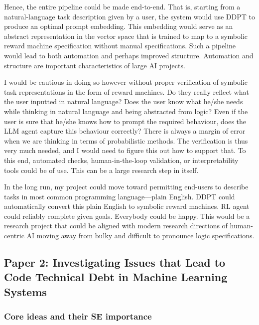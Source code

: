 \documentclass[a4paper,10pt]{article} %
\begin{document}
Hence, the entire pipeline could be made end-to-end.
That is, starting from a natural-language task description given by a user, the system would use DDPT to produce an optimal prompt embedding.
This embedding would serve as an abstract representation in the vector space that is trained to map to a symbolic reward machine specification without manual specifications. Such a pipeline would lead to both automation and perhaps improved structure.
Automation and structure are important characteristics of large AI projects.

I would be cautious in doing so however without proper verification of symbolic task representations in the form of reward machines.
Do they really reflect what the user inputted in natural language?
Does the user know what he/she needs while thinking in natural language and being abstracted from logic?
Even if the user is sure that he/she knows how to prompt the required behaviour, does the LLM agent capture this behaviour correctly?
There is always a margin of error when we are thinking in terms of probabilistic methods.
The verification is thus very much needed, and I would need to figure this out how to support that.
To this end, automated checks, human-in-the-loop validation, or interpretability tools could be of use.
This can be a large research step in itself.

In the long run, my project could move toward permitting end-users to describe tasks in most common programming language---plain English.
DDPT could automatically convert this plain English to symbolic reward machines.
RL agent could reliably complete given goals.
Everybody could be happy.
This would be a research project that could be aligned with modern research directions of human-centric AI moving away from bulky and difficult to pronounce logic specifications.


\subsection{Paper 2: Investigating Issues that Lead to Code Technical Debt in Machine Learning Systems}

\subsubsection{Core ideas and their SE importance}
\end{document}
